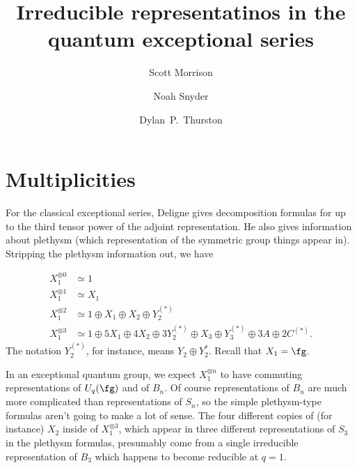 \documentclass[12pt]{amsart}
\begin{document}
\title{Irreducible representatinos in the quantum exceptional series}

\author[Morrison]{Scott Morrison}
\address{Mathematical Sciences Institute, Australian National University}

\author[Snyder]{Noah Snyder}
\address{Bloomington, Indiana, USA}

\author[Thurston]{Dylan~P.~Thurston}
\address{Bloomington, Indiana, USA}

\maketitle

\section{Multiplicities}
\label{sec:multiplicities}

For the classical exceptional series, Deligne \cite{MR1378507} gives
decomposition formulas for up to the third tensor power of the adjoint
representation. He also gives information about plethysm (which
representation of the symmetric group things appear in). Stripping
the plethysm information out, we have

\begin{align*}
  X_1^{\otimes 0} &\simeq 1\\
  X_1^{\otimes 1} &\simeq X_1\\
  X_1^{\otimes 2} &\simeq 1 \oplus X_1 \oplus X_2 \oplus Y_2^{(*)}\\
  X_1^{\otimes 3} &\simeq 1 \oplus 5X_1 \oplus 4X_2 \oplus 3Y_2^{(*)} \oplus X_3
                    \oplus Y_3^{(*)} \oplus 3A \oplus 2C^{(*)}.
\end{align*}
The notation $Y_2^{(*)}$, for instance, means $Y_2 \oplus
Y_2^*$. Recall that $X_1 = \fg$.

In an exceptional quantum group, we expect $X_1^{\otimes n}$ to have
commuting representations of $U_q(\fg)$ and of $B_n$. Of course
representations of $B_n$ are much more complicated than
representations of $S_n$, so the simple plethysm-type formulas aren't
going to make a lot of sense. The four different copies of (for instance)
$X_2$ inside of $X_1^{\otimes 3}$, which appear in three different
representations of $S_3$ in the plethysm formulas, presumably come
from a single irreducible representation of $B_3$ which happens to
become reducible at $q=1$.
\end{document}
